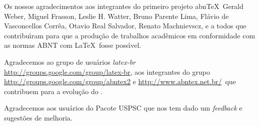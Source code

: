 \begin{agradecimentos}
	Os nossos agradecimentos aos integrantes do primeiro
	projeto abn\TeX\, Gerald Weber, Miguel Frasson, Leslie H. Watter, Bruno Parente Lima, Fl\'avio de Vasconcellos Corr\^ea, Otavio Real
	Salvador, Renato Machnievscz, e a todos que contribu\'{\i}ram para que a produ\c{c}\~ao de trabalhos acad\^emicos em conformidade com
	as normas ABNT com \LaTeX\ fosse poss\'{\i}vel.
	
	Agradecemos ao grupo de usu\'arios
	\emph{latex-br}  {\url{http://groups.google.com/group/latex-br}}, aos integrantes do grupo
	\emph{\abnTeX}  {\url{http://groups.google.com/group/abntex2}  e \url{http://www.abntex.net.br/}}~que contribuem para a evolu\c{c}\~ao do \abnTeX.
	
	Agradecemos aos usu\'arios do Pacote USPSC que nos tem dado um \textit{feedback} e sugest\~oes de melhoria. 
	
\end{agradecimentos}
